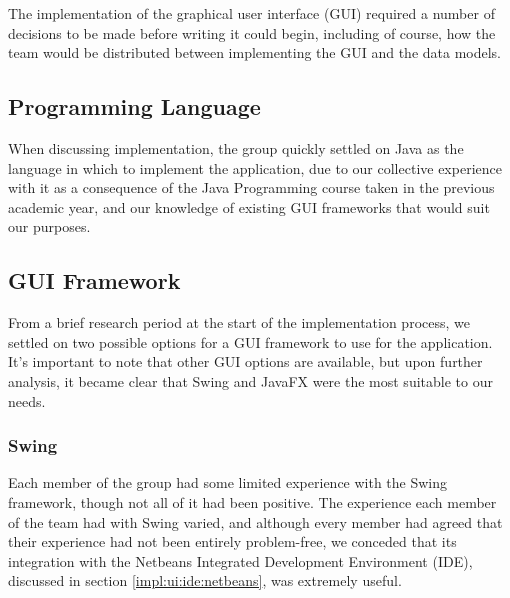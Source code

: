 The implementation of the graphical user interface (GUI) required a number
of decisions to be made before writing it could begin, including of
course, how the team would be distributed between implementing the GUI
and the data models.



\subsection{Programming Language}
\label{impl:ui:programminglanguage}

When discussing implementation, the group quickly settled on Java as
the language in which to implement the application, due to our 
collective experience with it as a consequence of the Java Programming
course taken in the previous academic year, and our knowledge of
existing GUI frameworks that would suit our purposes.


\subsection{GUI Framework}
\label{impl:ui:guiframework}

From a brief research period at the start of the implementation 
process, we settled on two possible options for a GUI framework to use
for the application. It's important to note that other GUI options are
available, but upon further analysis, it became clear that Swing and 
JavaFX were the most suitable to our needs.


\subsubsection{Swing}
\label{impl:ui:guiframework:swing}

Each member of the group had some limited experience with the Swing 
framework, though not all of it had been positive.
The experience each member of the team had with Swing varied, and
although every member had agreed that their experience had not been
entirely problem-free, we conceded that its integration with the Netbeans
Integrated Development Environment (IDE), discussed in section
\ref{impl:ui:ide:netbeans}, was extremely useful.

